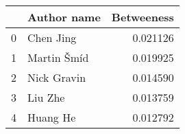 \begin{tabular}{llr}
\toprule
{} &  Author name &  Betweeness \\
\midrule
0 &   Chen  Jing &    0.021126 \\
1 &  Martin Šmíd &    0.019925 \\
2 &  Nick Gravin &    0.014590 \\
3 &     Liu  Zhe &    0.013759 \\
4 &    Huang  He &    0.012792 \\
\bottomrule
\end{tabular}
